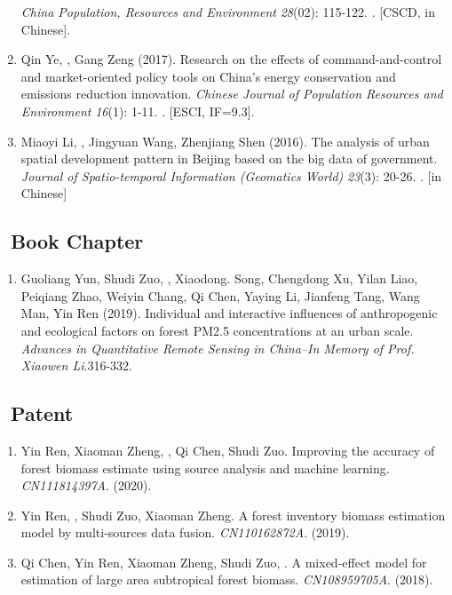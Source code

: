 \begin{enumerate}
    \textit{China Population, Resources and Environment} \textit{28}(02): 115-122.
    . [CSCD, in Chinese].
\item
    Qin Ye, \Shaoqing, Gang Zeng (2017).
	Research on the effects of command-and-control and market-oriented policy tools on China’s energy conservation and emissions reduction innovation.
    \textit{Chinese Journal of Population Resources and Environment} \textit{16}(1): 1-11.
    . [ESCI, IF=9.3].
\item
    Miaoyi Li, \Shaoqing, Jingyuan Wang, Zhenjiang Shen (2016).
	The analysis of urban spatial development pattern in Beijing based on the big data of government.
    \textit{Journal of Spatio-temporal Information (Geomatics World)} \textit{23}(3): 20-26.
    . [in Chinese]
\end{enumerate}

\subsection*{\texorpdfstring{\faBook\ Book Chapter}{Book Chapter}}
\begin{enumerate}
\item
    Guoliang Yun, Shudi Zuo, \Shaoqing, Xiaodong. Song, Chengdong Xu, Yilan Liao, Peiqiang Zhao, Weiyin Chang, Qi Chen, Yaying Li, Jianfeng Tang, Wang Man, Yin Ren (2019).
	Individual and interactive influences of anthropogenic and ecological factors on forest PM2.5 concentrations at an urban scale.
    \textit{Advances in Quantitative Remote Sensing in China–In Memory of Prof. Xiaowen Li}.316-332.
\end{enumerate}

\subsection*{\texorpdfstring{\faBook\ Patent}{Patent}}
\begin{enumerate}
\item
     Yin Ren, Xiaoman Zheng, \Shaoqing, Qi Chen, Shudi Zuo.
     Improving the accuracy of forest biomass estimate using source analysis and machine learning.
     \textit{CN111814397A}. (2020).
\item
     Yin Ren, \Shaoqing, Shudi Zuo, Xiaoman Zheng.
     A forest inventory biomass estimation model by multi-sources data fusion.
     \textit{CN110162872A}. (2019).
\item
     Qi Chen, Yin Ren, Xiaoman Zheng, Shudi Zuo, \Shaoqing.
     A mixed-effect model for estimation of large area subtropical forest biomass.
     \textit{CN108959705A}. (2018).
\end{enumerate}

